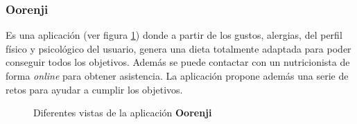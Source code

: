\subsubsection{Oorenji}
Es una aplicación \cite{app_orenji}(ver figura \ref{fig:orenji_app}) donde a partir de los gustos, alergias, del perfil físico y psicológico del usuario, genera una dieta totalmente adaptada para poder conseguir todos los objetivos. Además se puede contactar con un nutricionista de forma \textit{online} para obtener asistencia. La aplicación propone además una serie de retos para ayudar a cumplir los objetivos.
\begin{figure}[H]
    \centering
    \caption{Diferentes vistas de la aplicación \textbf{Oorenji}}
    \label{fig:orenji_app}
\end{figure}

